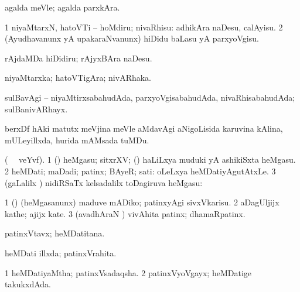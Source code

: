 {{{{{{\bentry
{}
  \gl{\kirxvi}\bmng
{} 
\emng
\eentry

\bentry
{}
  \gl{\kirxvi}\bmng
agalda meVle; agalda parxkAra. 
\emng
\eentry

\bentry
{}
\gl{\sakirx}
\bmng
\bnum
\num{1} niyaMtarxN, hatoVTi -- hoMdiru; nivaRhisu:  adhikAra naDesu, calAyisu. 
\num{2} (Ayudhavanunx yA upakaraNvanunx) hiDidu baLasu yA parxyoVgisu. 
\enum
\emng

\noindent 
\gl{\pagu}
\bmng
{} rAjdaMDa hiDidiru; rAjyxBAra naDesu. 
\emng
\eentry

\bentry
{}
  \gl{\nA}\bmng
niyaMtarxka; hatoVTigAra; nivARhaka. 
\emng
\eentry

\bentry
{} 
\gl{\gu}
\bmng
sulBavAgi -- niyaMtirxsabahudAda, parxyoVgisabahudAda, nivaRhisabahudAda; sulBanivARhayx. 
\emng
\eentry

\bentry
{}
\gl{\nA}
\bmng
berxDf hAki matutx meVjina meVle aMdavAgi aNigoLisida karuvina kAlina, mULeyillxda, hurida mAMsada tuMDu. 
\emng
\eentry

\bentry
{} 
 \gl{\nA} (\bava\  \ucAcx\ veYvf).\bmng
\bnum
\num{1} (\pArxparx) heMgasu; sitxrXV; (\kanmu) haLiLxya muduki yA ashikiSxta heMgasu. 
\num{2} heMDati; maDadi; patinx; BAyeR; sati:  oLeLxya heMDatiyAgutAtxLe. 
\num{3} (\saMpa gaLalilx \parx) nidiRSaTx kelsadalilx toDagiruva heMgasu:  
\enum
\emng

\noindent 
\gl{\pagu}
\bmng
\bnum
\num{1} (\pArxparx) (heMgasanunx) maduve mADiko; patinxyAgi sivxVkarisu. 
\num{2}  aDagUljijx kathe; ajijx kate. 
\num{3}  (avadhAraN \parx) vivAhita patinx; dhamaRpatinx. 
\enum
\emng
\eentry

\bentry
{}
  \gl{\nA}\bmng
patinxVtavx; heMDatitana. 
\emng
\eentry

\bentry
{}
  \gl{\gu}\bmng
heMDati illxda; patinxVrahita. 
\emng
\eentry

\bentry
{} 
\gl{\gu}
\expl{}
\bmng
\bnum
\num{1} heMDatiyaMtha; patinxVsadaqsha. 
\num{2} patinxVyoVgayx; heMDatige takukxdAda. 
\enum
\emng
\eentry

}}}}}}
